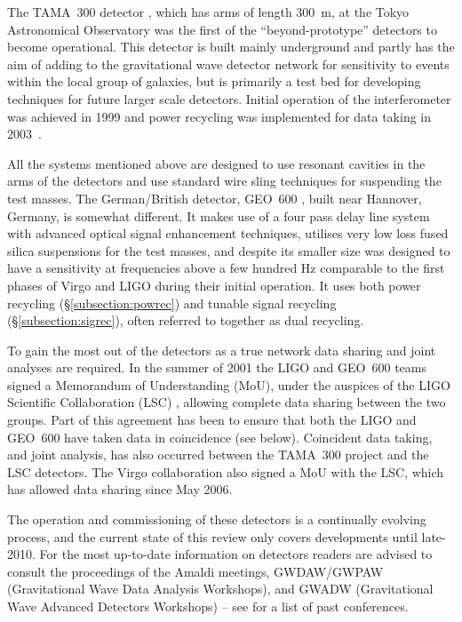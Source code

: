 \documentclass{article}
\begin{document}
The TAMA~300 detector \cite{TAMAweb}, which has arms of length 300~m, at the
Tokyo Astronomical Observatory was the first of the ``beyond-prototype''
detectors to become operational. This detector is built mainly underground and
partly has the aim of adding to the gravitational wave detector network for
sensitivity to events within the local group of galaxies, but is primarily a
test bed for developing techniques for future larger scale detectors. Initial
operation of the interferometer was achieved in 1999 and power recycling was
implemented for data taking in 2003~\cite{Arai:2003}.

All the systems mentioned above are designed to use resonant cavities in the
arms of the detectors and use standard wire sling techniques for suspending the
test masses. The German/British detector, GEO~600 \cite{GEOweb}, built near
Hannover, Germany, is somewhat different. It makes use of a four pass delay line
system with advanced optical signal enhancement techniques, utilises very low
loss fused silica suspensions for the test masses, and despite its smaller size 
was designed to have a sensitivity at frequencies above a few hundred Hz
comparable to the first phases of Virgo and LIGO during their initial operation.
It uses both power recycling (\S\ref{subsection:powrec}) and tunable signal
recycling (\S\ref{subsection:sigrec}), often referred to together as dual
recycling.

To gain the most out of the detectors as a true network data sharing and joint
analyses are required. In the summer of 2001 the LIGO and GEO~600 teams signed a
Memorandum of Understanding (MoU), under the auspices of the LIGO Scientific
Collaboration (LSC) \cite{LSCweb}, allowing complete data sharing between the
two groups. Part of this agreement has been to ensure that both the LIGO and
GEO~600 have taken data in coincidence (see below). Coincident data taking, and
joint analysis, has also occurred between the TAMA~300 project and the LSC
detectors. The Virgo collaboration also signed a MoU with the LSC, which has
allowed data sharing since May 2006.

The operation and commissioning of these detectors is a continually evolving
process, and the current state of this review only covers developments until
late-2010. For the most up-to-date information on detectors readers are advised
to consult the proceedings of the Amaldi meetings, GWDAW/GWPAW (Gravitational
Wave Data Analysis Workshops), and GWADW (Gravitational Wave Advanced Detectors
Workshops) -- see \cite{confs} for a list of past conferences.
\end{document}
